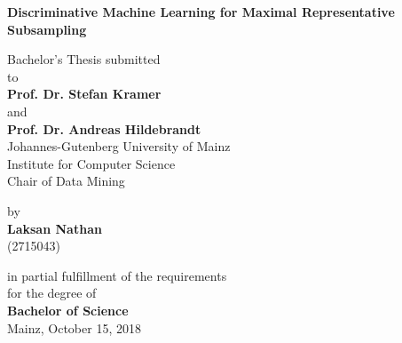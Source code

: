 \begin{center}

{\LARGE{\bf Discriminative Machine Learning for Maximal Representative Subsampling}} \vspace{1.0cm}



    {\normalsize Bachelor's Thesis submitted\\\vspace{0.5cm}
    to}\\\vspace{0.5cm}
    {\normalsize{\bf Prof. Dr. Stefan Kramer}} \\
    and \\
    {\normalsize{\bf Prof. Dr. Andreas Hildebrandt}} \\\vspace{0.5cm}
    {\normalsize Johannes-Gutenberg University of Mainz \\
    Institute for Computer Science \\
    Chair of Data Mining} \vspace{1cm}


    {\normalsize by \\\vspace{0.5cm}
    {\bf Laksan Nathan} \\
    (2715043)} \vspace{1cm}


    {\normalsize in partial fulfillment of the requirements \\
    for the degree of \\
    {\bf Bachelor of Science} \\
    Mainz, October 15, 2018}

\end{center}
